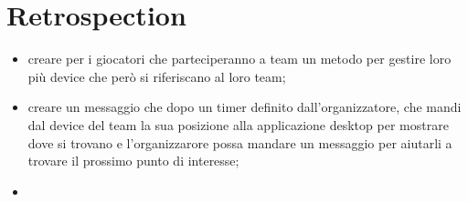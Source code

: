 \documentclass[12pt, italian]{article}
\begin{document}
\section{Retrospection}
\begin{itemize}
	\item creare per i giocatori che parteciperanno a team un metodo per gestire loro più device che però si riferiscano al loro team;
	\item creare un messaggio che dopo un timer definito dall'organizzatore, che mandi dal device del team la sua posizione alla applicazione desktop per mostrare dove si trovano e l'organizzarore possa mandare un messaggio per aiutarli a trovare il prossimo punto di interesse;
	\item 
\end{itemize}
\vspace{-30pt}
\end{document}
